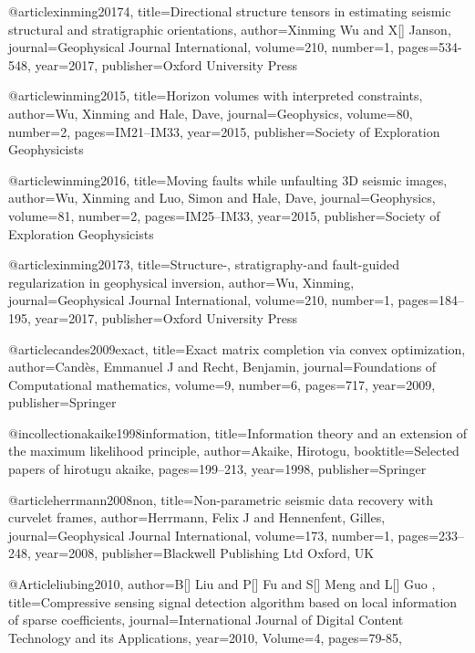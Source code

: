 @article{xinming20174,
  title={Directional structure tensors in estimating seismic structural and stratigraphic orientations},
  author={Xinming Wu and X[] Janson},
  journal={Geophysical Journal International},
  volume={210},
  number={1},
  pages={534-548},
  year={2017},
  publisher={Oxford University Press}
}

@article{winming2015,
  title={Horizon volumes with interpreted constraints},
  author={Wu, Xinming and Hale, Dave},
  journal={Geophysics},
  volume={80},
  number={2},
  pages={IM21--IM33},
  year={2015},
  publisher={Society of Exploration Geophysicists}
}

@article{winming2016,
  title={Moving faults while unfaulting 3D seismic images},
  author={Wu, Xinming and Luo, Simon and Hale, Dave},
  journal={Geophysics},
  volume={81},
  number={2},
  pages={IM25--IM33},
  year={2015},
  publisher={Society of Exploration Geophysicists}
}


@article{xinming20173,
  title={Structure-, stratigraphy-and fault-guided regularization in geophysical inversion},
  author={Wu, Xinming},
  journal={Geophysical Journal International},
  volume={210},
  number={1},
  pages={184--195},
  year={2017},
  publisher={Oxford University Press}
}

@article{candes2009exact,
  title={Exact matrix completion via convex optimization},
  author={Cand{\`e}s, Emmanuel J and Recht, Benjamin},
  journal={Foundations of Computational mathematics},
  volume={9},
  number={6},
  pages={717},
  year={2009},
  publisher={Springer}
}

@incollection{akaike1998information,
  title={Information theory and an extension of the maximum likelihood principle},
  author={Akaike, Hirotogu},
  booktitle={Selected papers of hirotugu akaike},
  pages={199--213},
  year={1998},
  publisher={Springer}
}

@article{herrmann2008non,
  title={Non-parametric seismic data recovery with curvelet frames},
  author={Herrmann, Felix J and Hennenfent, Gilles},
  journal={Geophysical Journal International},
  volume={173},
  number={1},
  pages={233--248},
  year={2008},
  publisher={Blackwell Publishing Ltd Oxford, UK}
}

@Article{liubing2010,
  author={B[] Liu and P[] Fu and S[] Meng and L[] Guo },
  title={Compressive sensing signal detection algorithm based on local information of sparse coefficients},
  journal={International Journal of Digital Content Technology and its Applications},
  year=2010,
  Volume=4,
  pages={79-85},
}


